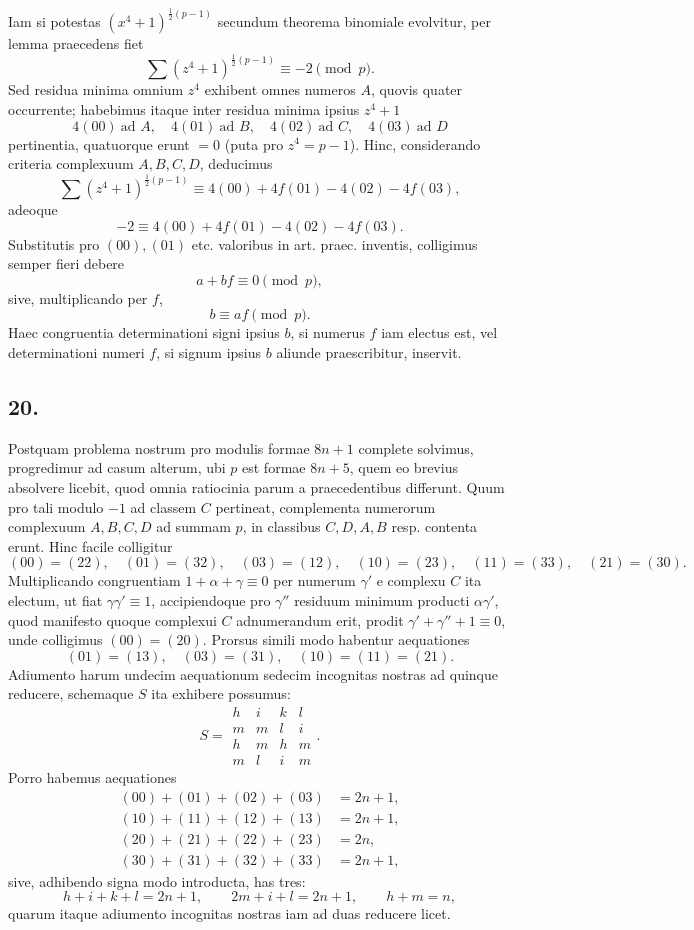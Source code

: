 \documentclass[12pt]{article}
\begin{document}
Iam si potestas $(x^4+1)^{\frac12(p-1)}$ secundum theorema binomiale evolvitur, per lemma praecedens fiet
\[
\sum (z^4+1)^{\frac12(p-1)}\equiv -2 \pmod p.
\]
Sed residua minima omnium $z^4$ exhibent omnes numeros $A$, quovis quater occurrente; habebimus itaque inter residua minima ipsius $z^4+1$
\[
4(00)\ \text{ad } A,\quad 4(01)\ \text{ad } B,\quad 4(02)\ \text{ad } C,\quad 4(03)\ \text{ad } D
\]
pertinentia, quatuorque erunt $=0$ (puta pro $z^4=p-1$). Hinc, considerando criteria complexuum $A,B,C,D$, deducimus
\[
\sum (z^4+1)^{\frac12(p-1)}\equiv 4(00)+4f(01)-4(02)-4f(03),
\]
adeoque
\[
-2\equiv4(00)+4f(01)-4(02)-4f(03).
\]
Substitutis pro $(00),(01)$ etc. valoribus in art. praec. inventis, colligimus semper fieri debere
\[
a+bf\equiv0\pmod p,
\]
sive, multiplicando per $f$,
\[
b\equiv af\pmod p.
\]
Haec congruentia determinationi signi ipsius $b$, si numerus $f$ iam electus est, vel determinationi numeri $f$, si signum ipsius $b$ aliunde praescribitur, inservit.

\subsection*{20.}

Postquam problema nostrum pro modulis formae $8n+1$ complete solvimus, progredimur ad casum alterum, ubi $p$ est formae $8n+5$, quem eo brevius absolvere licebit, quod omnia ratiocinia parum a praecedentibus differunt. Quum pro tali modulo $-1$ ad classem $C$ pertineat, complementa numerorum complexuum $A,B,C,D$ ad summam $p$, in classibus $C,D,A,B$ resp. contenta erunt. Hinc facile colligitur
\[
(00)=(22),\quad (01)=(32),\quad (03)=(12),\quad
(10)=(23),\quad (11)=(33),\quad (21)=(30).
\]
Multiplicando congruentiam $1+\alpha+\gamma\equiv0$ per numerum $\gamma'$ e complexu $C$ ita electum, ut fiat $\gamma\gamma'\equiv1$, accipiendoque pro $\gamma''$ residuum minimum producti $\alpha\gamma'$, quod manifesto quoque complexui $C$ adnumerandum erit, prodit $\gamma'+\gamma''+1\equiv0$, unde colligimus $(00)=(20)$. Prorsus simili modo habentur aequationes
\[
(01)=(13),\quad (03)=(31),\quad (10)=(11)=(21).
\]
Adiumento harum undecim aequationum sedecim incognitas nostras ad quinque reducere, schemaque $S$ ita exhibere possumus:
\[
S=\begin{array}{rrrr}
h&i&k&l\\
m&m&l&i\\
h&m&h&m\\
m&l&i&m
\end{array}.
\]
Porro habemus aequationes
\[
\begin{aligned}
(00)+(01)+(02)+(03)&=2n+1,\\
(10)+(11)+(12)+(13)&=2n+1,\\
(20)+(21)+(22)+(23)&=2n,\\
(30)+(31)+(32)+(33)&=2n+1,
\end{aligned}
\]
sive, adhibendo signa modo introducta, has tres:
\[
h+i+k+l=2n+1,\qquad 2m+i+l=2n+1,\qquad h+m=n,
\]
quarum itaque adiumento incognitas nostras iam ad duas reducere licet.
\end{document}
